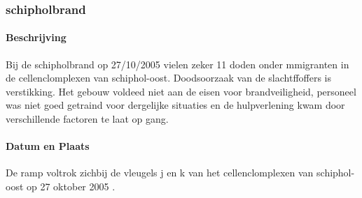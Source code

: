 \documentclass{article}
\begin{document}
	\subsubsection{schipholbrand}
	\paragraph{Beschrijving}
	Bij de schipholbrand op 27/10/2005 vielen zeker 11 doden onder mmigranten in de cellenclomplexen van schiphol-oost. Doodsoorzaak van de slachtffoffers is verstikking. Het gebouw voldeed niet aan de eisen voor brandveiligheid, personeel was niet goed getraind voor dergelijke situaties en de hulpverlening kwam door verschillende factoren te laat op gang.
	\paragraph{Datum en Plaats}
	De ramp voltrok zichbij de vleugels j en k  van het cellenclomplexen van schiphol-oost op 27 oktober 2005  . 
\end{document}

